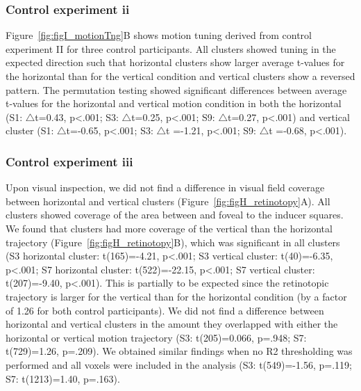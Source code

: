 \subsubsection{Control experiment ii}
Figure~\ref{fig:figI_motionTng}B shows motion tuning derived from control experiment II for three control participants. All clusters showed tuning in the expected direction such that horizontal clusters show larger average t-values for the horizontal than for the vertical condition and vertical clusters show a reversed pattern. The permutation testing showed significant differences between average t-values for the horizontal and vertical motion condition in both the horizontal (S1: $\bigtriangleup$t=0.43, p\textless.001; S3: $\bigtriangleup$t=0.25, p\textless.001; S9: $\bigtriangleup$t=0.27, p\textless.001) and vertical cluster (S1: $\bigtriangleup$t=-0.65, p\textless.001; S3: $\bigtriangleup$t =-1.21, p\textless.001; S9: $\bigtriangleup$t =-0.68, p\textless.001).

\subsubsection{Control experiment iii}
Upon visual inspection, we did not find a difference in visual field coverage between horizontal and vertical clusters (Figure~\ref{fig:figH_retinotopy}A). All clusters showed coverage of the area between and foveal to the inducer squares. We found that clusters had more coverage of the vertical than the horizontal trajectory (Figure~\ref{fig:figH_retinotopy}B), which was significant in all clusters (S3 horizontal cluster: t(165)=-4.21, p\textless.001; S3 vertical cluster: t(40)=-6.35, p\textless.001; S7 horizontal cluster: t(522)=-22.15, p\textless.001; S7 vertical cluster: t(207)=-9.40, p\textless.001). This is partially to be expected since the retinotopic trajectory is larger for the vertical than for the horizontal condition (by a factor of 1.26 for both control participants). We did not find a difference between horizontal and vertical clusters in the amount they overlapped with either the horizontal or vertical motion trajectory (S3: t(205)=0.066, p=.948; S7: t(729)=1.26, p=.209). We obtained similar findings when no R2 thresholding was performed and all voxels were included in the analysis (S3: t(549)=-1.56, p=.119; S7: t(1213)=1.40, p=.163).

